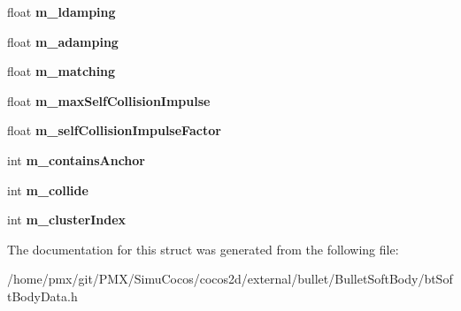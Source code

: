 \begin{DoxyCompactItemize}
\mbox{\label{structSoftBodyClusterData_acc7e6fa5e831c3f4dfe9fbc9632429c2}} 
float {\bfseries m\+\_\+ldamping}
\item 
\mbox{\label{structSoftBodyClusterData_af5bab36c7cb638342a869875ad3b90cd}} 
float {\bfseries m\+\_\+adamping}
\item 
\mbox{\label{structSoftBodyClusterData_ad750d17ec6489cd3bd5f92ad794a8891}} 
float {\bfseries m\+\_\+matching}
\item 
\mbox{\label{structSoftBodyClusterData_aa90d0d59195e96b3e5addb8b5cebca23}} 
float {\bfseries m\+\_\+max\+Self\+Collision\+Impulse}
\item 
\mbox{\label{structSoftBodyClusterData_af78309e9c32a1be74f7f7bff245f0d68}} 
float {\bfseries m\+\_\+self\+Collision\+Impulse\+Factor}
\item 
\mbox{\label{structSoftBodyClusterData_a69ef62e4117ebf173d836e72841a6275}} 
int {\bfseries m\+\_\+contains\+Anchor}
\item 
\mbox{\label{structSoftBodyClusterData_ab04a8dab21722c60a27ebbe8560e436a}} 
int {\bfseries m\+\_\+collide}
\item 
\mbox{\label{structSoftBodyClusterData_adeec97b03e256449a0e65d6bc1594542}} 
int {\bfseries m\+\_\+cluster\+Index}
\end{DoxyCompactItemize}


The documentation for this struct was generated from the following file\+:\begin{DoxyCompactItemize}
\item 
/home/pmx/git/\+P\+M\+X/\+Simu\+Cocos/cocos2d/external/bullet/\+Bullet\+Soft\+Body/bt\+Soft\+Body\+Data.\+h\end{DoxyCompactItemize}
